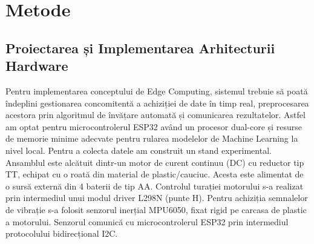 \chapter{Metode}
\section{Proiectarea și Implementarea Arhitecturii Hardware}

	Pentru implementarea conceptului de Edge Computing, sistemul trebuie să poată îndeplini gestionarea concomitentă a achiziției de date în timp real, preprocesarea acestora prin algoritmul de învățare automată și comunicarea rezultatelor. Astfel am optat pentru microcontrolerul ESP32 având un procesor dual-core și resurse de memorie minime adecvate pentru rularea modelelor de Machine Learning la nivel local. \cite{esp32_datasheet}
	Pentru a colecta datele am construit un stand experimental. Ansamblul este alcătuit dintr-un motor de curent continuu (DC) cu reductor tip TT, echipat cu o roată din material de plastic/cauciuc. Acesta este alimentat de o sursă externă din 4 baterii de tip AA. Controlul turației motorului s-a realizat prin intermediul unui modul driver L298N (punte H). \cite{handson:l298n_module}
	Pentru achiziția semnalelor de vibrație s-a folosit senzorul inerțial MPU6050, fixat rigid pe carcasa de plastic a motorului. Senzorul comunică cu microcontrolerul ESP32 prin intermediul protocolului bidirecțional I2C. \cite{nxp:i2c_specification}
